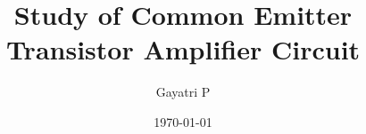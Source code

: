 \documentclass[reprint,amsmath,amssymb,aps]{revtex4-2}
\begin{document}
    \title{Study of Common Emitter Transistor Amplifier Circuit}

    \author{Gayatri P}
    \date{\today}

    
    \maketitle

    
    
    

    
    
    \nocite{*}
\end{document}

